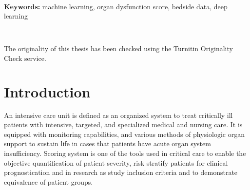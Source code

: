 \documentclass[12pt,a4paper,english
]{tunithesis}
\begin{document}
~

\noindent\textbf{Keywords:} machine learning, organ dysfunction score, bedside data, deep learning

~

\noindent The originality of this thesis has been checked using the Turnitin Originality Check service.




\setcounter{tocdepth}{3}              %
\tableofcontents                      %


\if@twoside
\cleardoublepage
\fi


\renewcommand{\chaptername}{} %


\chapter{Introduction}
\label{ch:intro} 

\setcounter{page}{1} %
                     


An intensive care unit is defined as an organized system to treat critically ill patients with intensive, targeted, and specialized medical and nursing care. It is equipped with monitoring capabilities, and various methods of physiologic organ support to sustain life in cases that patients have acute organ system insufficiency. Scoring system is one of the tools used in critical care to enable the objective quantification of patient severity, risk stratify patients for clinical prognostication and in research as study inclusion criteria and to demonstrate equivalence of patient groups. \parencite{Marshell2017}
\end{document}
